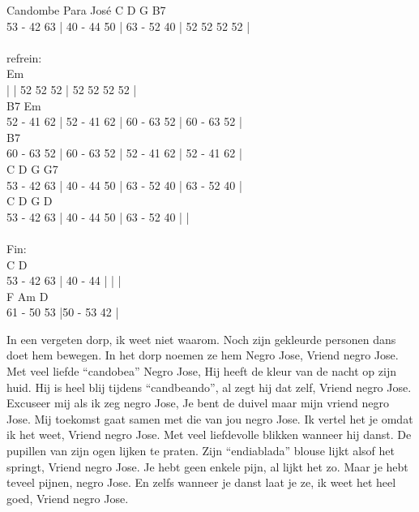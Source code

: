 \begin{song}[candombe]{Candombe Para José}
C D G B7\\
53 - 42 63 | 40 - 44 50 | 63 - 52 40 | 52 52 52 52 |\\\\
refrein:\\
Em\\
 | | 52 52 52 | 52 52 52 52 |\\
B7 Em\\
52 - 41 62 | 52 - 41 62 | 60 - 63 52 | 60 - 63 52 |\\
B7\\
60 - 63 52 | 60 - 63 52 | 52 - 41 62 | 52 - 41 62 |\\
C D G G7\\
53 - 42 63 | 40 - 44 50 | 63 - 52 40 | 63 - 52 40 |\\
C D G D\\
53 - 42 63 | 40 - 44 50 | 63 - 52 40 | |\\\\
Fin:\\
C D\\
53 - 42 63 | 40 - 44 | | |\\
F Am D\\
61 - 50 53 |50 - 53 42 | \\
\end{song}

\clearpage
\begin{translation}
In een vergeten dorp, ik weet niet waarom.
Noch zijn gekleurde personen dans doet hem bewegen.
In het dorp noemen ze hem Negro Jose,
Vriend negro Jose.
Met veel liefde “candobea” Negro Jose,
Hij heeft de kleur van de nacht op zijn huid.
Hij is heel blij tijdens “candbeando”, al zegt hij dat zelf,
Vriend negro Jose.
Excuseer mij als ik zeg negro Jose,
Je bent de duivel maar mijn vriend negro Jose.
Mij toekomst gaat samen met die van jou negro Jose.
Ik vertel het je omdat ik het weet,
Vriend negro Jose.
Met veel liefdevolle blikken wanneer hij danst.
De pupillen van zijn ogen lijken te praten.
Zijn “endiablada” blouse lijkt alsof het springt,
Vriend negro Jose.
Je hebt geen enkele pijn, al lijkt het zo.
Maar je hebt teveel pijnen, negro Jose.
En zelfs wanneer je danst laat je ze, ik weet het heel goed,
Vriend negro Jose.
\end{translation}
